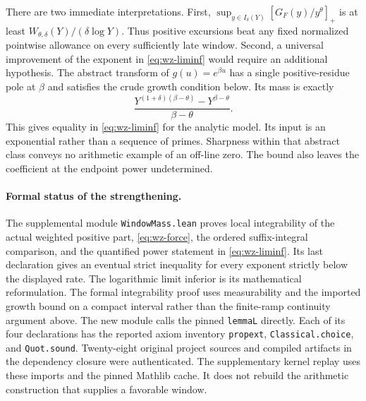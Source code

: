 \documentclass[12pt,letterpaper]{article}
\begin{document}
There are two immediate interpretations. First, \(\sup_{y\in I_\delta(Y)}[G_F(y)/y^\theta]_+\) is at least \(W_{\theta,\delta}(Y)/(\delta\log Y)\). Thus positive excursions beat any fixed normalized pointwise allowance on every sufficiently late window. Second, a universal improvement of the exponent in \eqref{eq:wz-liminf} would require an additional hypothesis. The abstract transform of \(g(u)=e^{\beta u}\) has a single positive-residue pole at \(\beta\) and satisfies the crude growth condition below. Its mass is exactly
\[
 \frac{Y^{(1+\delta)(\beta-\theta)}-Y^{\beta-\theta}}{\beta-\theta}.
\]
This gives equality in \eqref{eq:wz-liminf} for the analytic model. Its input is an exponential rather than a sequence of primes. Sharpness within that abstract class conveys no arithmetic example of an off-line zero. The bound also leaves the coefficient at the endpoint power undetermined.

\paragraph{Formal status of the strengthening.}
The supplemental module \texttt{WindowMass.lean} proves local integrability of the actual weighted positive part, \eqref{eq:wz-force}, the ordered suffix-integral comparison, and the quantified power statement in \eqref{eq:wz-liminf}. Its last declaration gives an eventual strict inequality for every exponent strictly below the displayed rate. The logarithmic limit inferior is its mathematical reformulation. The formal integrability proof uses measurability and the imported growth bound on a compact interval rather than the finite-ramp continuity argument above. The new module calls the pinned \texttt{lemmaL} directly. Each of its four declarations has the reported axiom inventory \texttt{propext}, \texttt{Classical.choice}, and \texttt{Quot.sound}. Twenty-eight original project sources and compiled artifacts in the dependency closure were authenticated. The supplementary kernel replay uses these imports and the pinned Mathlib cache. It does not rebuild the arithmetic construction that supplies a favorable window. 
\end{document}
